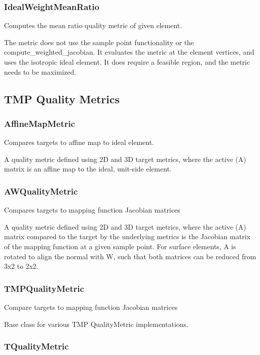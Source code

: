 \subsubsection{IdealWeightMeanRatio}

Computes the mean ratio quality metric of given element.
     
 The metric does not use the sample point functionality or the     compute\_weighted\_jacobian.  It evaluates the metric at the element vertices, and uses the isotropic ideal element.  It does require a feasible region, and the metric needs to be maximized.

\subsection{TMP Quality Metrics}

\subsubsection{AffineMapMetric}

Compares targets to affine map to ideal element.

A quality metric defined using 2D and 3D target metrics, where the active (A) matrix is an affine map to the ideal, unit-side element.  

\subsubsection{AWQualityMetric}

Compares targets to mapping function Jacobian matrices
 
 A quality metric defined using 2D and 3D target metrics, where the active (A) matrix compared to the target by the underlying metrics is the Jacobian matrix of the mapping function at a given sample point.  For surface elements, A is rotated to align the normal with W, such that both matrices can be reduced from 3x2 to 2x2.

\subsubsection{TMPQualityMetric}

Compare targets to mapping function Jacobian matrices
 
 Base class for various TMP QualityMetric implementations.

\subsubsection{TQualityMetric}

